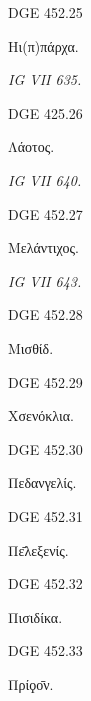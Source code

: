 \begin{versi}{DGE 452.25}
\begin{greek}
Hι(π)πάρχα.
\end{greek}
\end{versi}
\textit{IG VII 635.}

\begin{versi}{DGE 425.26}
\begin{greek}
Λάοτος.
\end{greek}
\end{versi}
\textit{IG VII 640.}

\begin{versi}{DGE 452.27}
\begin{greek}
Μελάντιχος.
\end{greek}
\end{versi}
\textit{IG VII 643.}

\begin{versi}{DGE 452.28}
\begin{greek}
Μισθίδ.
\end{greek}
\end{versi}

\begin{versi}{DGE 452.29}
\begin{greek}
Χσενόκλια.
\end{greek}
\end{versi}

\begin{versi}{DGE 452.30}
\begin{greek}
Πεδανγελίς.
\end{greek}
\end{versi}

\begin{versi}{DGE 452.31}
\begin{greek}
Πε̄λεξενίς.
\end{greek}
\end{versi}

\begin{versi}{DGE 452.32}
\begin{greek}
Πισιδίκα.
\end{greek}
\end{versi}

\begin{versi}{DGE 452.33}
\begin{greek}
Πρίϙο̄ν.
\end{greek}
\end{versi}

